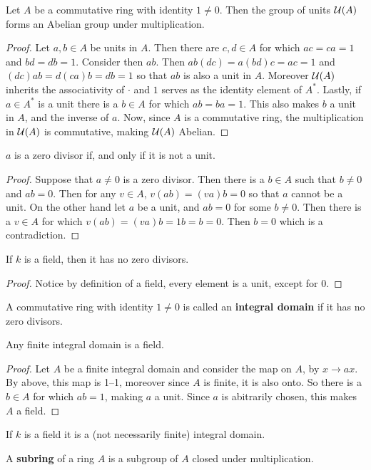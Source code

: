 \begin{lemma}\label{1.1.3}
    Let $A$ be a commutative ring with identity $1 \neq 0$. Then the group of units
    $\mathcal{U}(A)$ forms an Abelian group under multiplication.
\end{lemma}
\begin{proof}
    Let $a,b \in A$ be units in $A$. Then there are $c,d \in A$ for which
    $ac=ca=1$ and  $bd=db=1$. Consider then $ab$. Then  $ab(dc)=a(bd)c=ac=1$ and
    $(dc)ab=d(ca)b=db=1$ so that $ab$ is also a unit in $A$. Moreover $\mathcal{U}(A)$
    inherits the associativity of  $\cdot$ and $1$ serves as the identity
    element of $A^\ast$. Lastly, if $a \in A^\ast$ is a unit there is a $b
    \in A$ for which $ab=ba=1$. This also makes $b$ a unit in $A$, and the
    inverse of $a$. Now, since $A$ is a commutative ring, the multiplication in
     $\mathcal{U}(A)$ is commutative, making $\mathcal{U}(A)$ Abelian.
\end{proof}
\begin{corollary}
    $a$ is a zero divisor if, and only if it is not a unit.
\end{corollary}
\begin{proof}
    Suppose that $a \neq 0$ is a zero divisor. Then there is a  $b \in A$ such
    that $b \neq 0$ and $ab=0$. Then for any $v \in A$,  $v(ab)=(va)b=0$ so that
    $a$ cannot be a unit. On the other hand let  $a$ be a unit, and  $ab=0$ for
    some  $b \neq 0$. Then there is a  $v \in A$ for which
    $v(ab)=(va)b=1b=b=0$. Then $b=0$ which is a contradiction.
\end{proof}
\begin{corollary}
    If $k$ is a field, then it has no zero divisors.
\end{corollary}
\begin{proof}
    Notice by definition of a field, every element is a unit, except for $0$.
\end{proof}

\begin{definition}
    A commutative ring with identity $1 \neq 0$ is called an \textbf{integral
    domain} if it has no zero divisors.
\end{definition}

\begin{lemma}\label{1.1.3}
    Any finite integral domain is a field.
\end{lemma}
\begin{proof}
    Let $A$ be a finite integral domain and consider the map on $A$, by $x
    \xrightarrow{} ax$. By above, this map is 1--1, moreover since $A$ is
    finite, it is also onto. So there is a $b \in A$ for which $ab=1$, making
    $a$ a unit. Since $a$ is abitrarily chosen, this makes $A$ a field.
\end{proof}
\begin{corollary}
    If $k$ is a field it is a (not necessarily finite) integral domain.
\end{corollary}

\begin{definition}
    A \textbf{subring} of a ring $A$ is a subgroup of $A$ closed under
    multiplication.
\end{definition}

